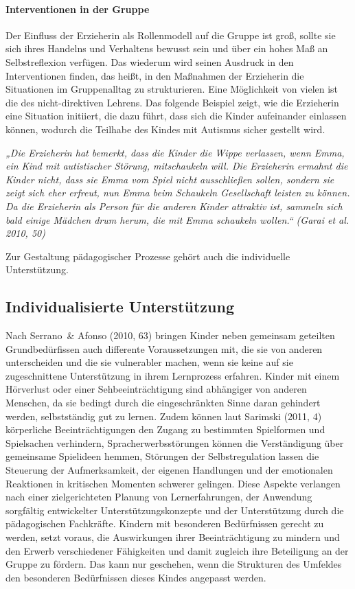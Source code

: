 \paragraph{Interventionen in der Gruppe}
Der Einfluss der Erzieherin als Rollenmodell auf die Gruppe ist groß, sollte sie sich ihres Handelns und Verhaltens bewusst sein und über ein hohes Maß an Selbstreflexion verfügen. Das wiederum wird seinen Ausdruck in den Interventionen finden, das heißt, in den Maßnahmen der Erzieherin die Situationen im Gruppenalltag zu strukturieren. Eine Möglichkeit von vielen ist die des nicht-direktiven Lehrens. Das folgende Beispiel zeigt, wie die Erzieherin eine Situation initiiert, die dazu führt, dass sich die Kinder aufeinander einlassen können, wodurch die Teilhabe des Kindes mit Autismus sicher gestellt wird. 

\emph{„Die Erzieherin hat bemerkt, dass die Kinder die Wippe verlassen, wenn Emma, ein Kind mit autistischer Störung, mitschaukeln will. Die Erzieherin ermahnt die Kinder nicht, dass sie Emma vom Spiel nicht ausschließen sollen, sondern sie zeigt sich eher erfreut, nun Emma beim Schaukeln Gesellschaft leisten zu können. Da die Erzieherin als Person für die anderen Kinder attraktiv ist, sammeln sich bald einige Mädchen drum herum, die mit Emma schaukeln wollen.“ (Garai et al. 2010, 50)}

Zur Gestaltung pädagogischer Prozesse gehört auch die individuelle Unterstützung.

\subsection{Individualisierte Unterstützung} 
\label{Individualisierung}

Nach Serrano~\& Afonso (2010, 63) bringen Kinder neben gemeinsam geteilten Grundbedürfissen auch differente Voraussetzungen mit, die sie von anderen unterscheiden und die sie vulnerabler machen, wenn sie keine auf sie zugeschnittene Unterstützung in ihrem Lernprozess erfahren. Kinder mit einem Hörverlust oder einer Sehbeeinträchtigung sind abhängiger von anderen Menschen, da sie bedingt durch die eingeschränkten Sinne daran gehindert werden, selbstständig gut zu lernen. Zudem können laut Sarimski (2011, 4) körperliche Beeinträchtigungen den Zugang zu bestimmten Spielformen und Spielsachen verhindern, Spracherwerbsstörungen können die Verständigung über gemeinsame Spielideen hemmen, Störungen der Selbstregulation lassen die Steuerung der Aufmerksamkeit, der eigenen Handlungen und der emotionalen Reaktionen in kritischen Momenten schwerer gelingen.    
Diese Aspekte verlangen nach einer zielgerichteten Planung von Lernerfahrungen, der Anwendung sorgfältig entwickelter Unterstützungskonzepte und der Unterstützung durch die pädagogischen Fachkräfte. Kindern mit besonderen Bedürfnissen gerecht zu werden, setzt voraus, die Auswirkungen ihrer Beeinträchtigung zu mindern und den Erwerb verschiedener Fähigkeiten und damit zugleich ihre Beteiligung an der Gruppe zu fördern. Das kann nur geschehen, wenn die Strukturen des Umfeldes den besonderen Bedürfnissen dieses Kindes angepasst werden. 


